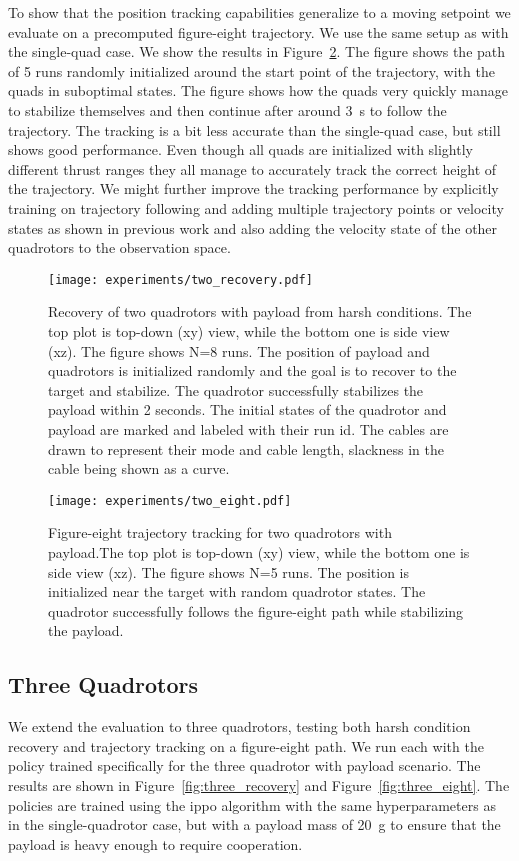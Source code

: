 To show that the position tracking capabilities generalize to a moving setpoint we evaluate on a precomputed figure-eight trajectory. We use the same setup as with the single-quad case. We show the results in Figure~\ref{fig:two_eight}. The figure shows the path of 5 runs randomly initialized around the start point of the trajectory, with the quads in suboptimal states. The figure shows how the quads very quickly manage to stabilize themselves and then continue after around 3~s to follow the trajectory. The tracking is a bit less accurate than the single-quad case, but still shows good performance. Even though all quads are initialized with slightly different thrust ranges they all manage to accurately track the correct height of the trajectory. We might further improve the tracking performance by explicitly training on trajectory following and adding multiple trajectory points or velocity states as shown in previous work and also adding the velocity state of the other quadrotors to the observation space.
\begin{figure}[H]
    \centering
    \texttt{[image: experiments/two\_recovery.pdf]}
    \caption[Two quadrotor harsh recovery trajectory]{Recovery of two quadrotors with payload from harsh conditions. The top plot is top-down  (xy) view, while the bottom one is side view (xz).
    The figure shows N=8 runs. The position of payload and quadrotors is initialized randomly and the goal is to recover to the target and stabilize. The quadrotor successfully stabilizes the payload within 2 seconds. The initial states of the quadrotor and payload are marked and labeled with their run id. The cables are drawn to represent their mode and cable length, slackness in the cable being shown as a curve.}
    \label{fig:two_recovery}
\end{figure}
\begin{figure}[H]
    \centering
    
    \texttt{[image: experiments/two\_eight.pdf]}
    \caption[Two quadrotor figure-eight tracking]{Figure-eight trajectory tracking for two quadrotors with payload.The top plot is top-down  (xy) view, while the bottom one is side view (xz). The figure shows N=5 runs. The position is initialized near the target with random quadrotor states. The quadrotor successfully follows the figure-eight path while stabilizing the payload.}
    \label{fig:two_eight}
\end{figure}
\subsection{Three Quadrotors}
We extend the evaluation to three quadrotors, testing both harsh condition recovery and trajectory tracking on a figure-eight path. We run each with the policy trained specifically for the three quadrotor with payload scenario. The results are shown in Figure~\ref{fig:three_recovery} and Figure~\ref{fig:three_eight}. The policies are trained using the \gls{ippo} algorithm with the same hyperparameters as in the single-quadrotor case, but with a payload mass of 20~g to ensure that the payload is heavy enough to require cooperation.

